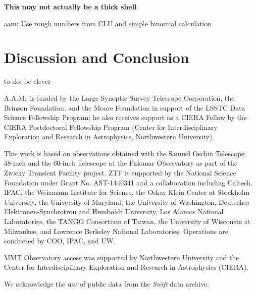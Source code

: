 \documentclass[twocolumn]{aastex63}
\newcommand{\aam}[1]{{\color{DarkOrange} aam: {#1}}}
\newcommand{\todo}[1]{{\color{magenta} to-do: {#1}}}
\begin{document}
\textbf{This may not actually be a thick shell}

\aam{Use rough numbers from CLU and simple binomial calculation}

\section{Discussion and Conclusion}\label{sec:conclusions}

\todo{be clever}

\acknowledgements

A.A.M.~is funded by the Large Synoptic Survey Telescope Corporation, the
Brinson Foundation, and the Moore Foundation in support of the LSSTC Data
Science Fellowship Program; he also receives support as a CIERA Fellow by the
CIERA Postdoctoral Fellowship Program (Center for Interdisciplinary
Exploration and Research in Astrophysics, Northwestern University).

This work is based on observations obtained with the Samuel Oschin Telescope
48-inch and the 60-inch Telescope at the Palomar Observatory as part of the
Zwicky Transient Facility project. ZTF is supported by the National Science
Foundation under Grant No. AST-1440341 and a collaboration including Caltech,
IPAC, the Weizmann Institute for Science, the Oskar Klein Center at Stockholm
University, the University of Maryland, the University of Washington,
Deutsches Elektronen-Synchrotron and Humboldt University, Los Alamos National
Laboratories, the TANGO Consortium of Taiwan, the University of Wisconsin at
Milwaukee, and Lawrence Berkeley National Laboratories. Operations are
conducted by COO, IPAC, and UW.

MMT Observatory access was supported by Northwestern University and the
Center for Interdisciplinary Exploration and Research in Astrophysics (CIERA).

We acknowledge the use of public data from the \textit{Swift} data archive.


\end{document}
